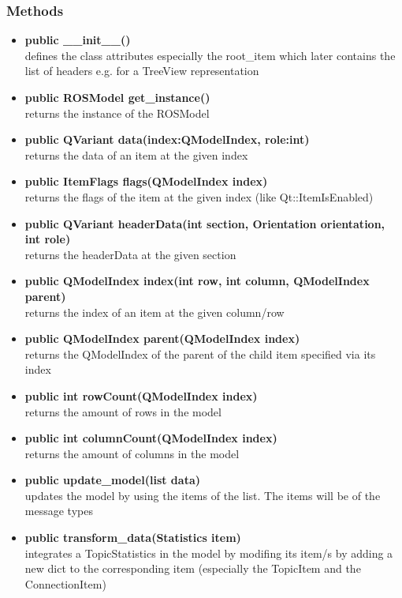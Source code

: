 \subsubsection{Methods}
\begin{itemize}
  \item \textbf{public \_\_init\_\_()}\\ 
  defines the class attributes especially the root\_item which later contains the list of headers e.g. for a TreeView representation
  \item \textbf{public ROSModel get\_instance()}\\
  returns the instance of the ROSModel
  \item \textbf{public QVariant data(index:QModelIndex, role:int)}\\
  returns the data of an item at the given index
  \item \textbf{public ItemFlags flags(QModelIndex index)}\\
  returns the flags of the item at the given index (like Qt::ItemIsEnabled)
  \item \textbf{public QVariant headerData(int section, Orientation orientation, int role)}\\ 
  returns the headerData  at the given section
  \item \textbf{public QModelIndex index(int row, int column, QModelIndex parent)}\\
  returns the index of an item at the given column/row
  \item \textbf{public QModelIndex parent(QModelIndex index)}\\ 
  returns the QModelIndex of the parent of the child item specified via its index
  \item \textbf{public int rowCount(QModelIndex index)}\\ 
  returns the amount of rows in the model
  \item \textbf{public int columnCount(QModelIndex index)}\\
  returns the amount of columns in the model
  \item \textbf{public update\_model(list data)}\\ 
  updates the model by using the items of the list. The items will be of the message types 
  \item \textbf{public transform\_data(Statistics item)}\\ 
  integrates a TopicStatistics in the model by modifing its item/s by adding a new dict to the corresponding item (especially the TopicItem and the ConnectionItem)

\end{itemize}
